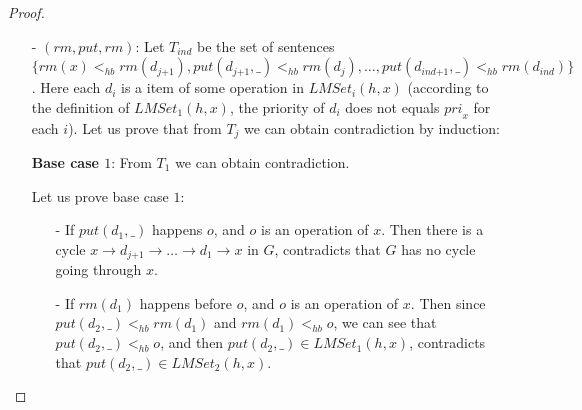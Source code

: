 \begin {proof}
\begin{itemize}
\begin{itemize}
    \item[-] If $( j = 1 ) \wedge ( \textit{put}(d_j,\_) <_{hb} o'' )$, where $o''$ is an operation of $x$: Similar to above case.

    \item[-] If $( j > 1 ) \wedge ( \textit{rm}(d_j) <_{hb} o'' )$, where $o''$ is an operation of item $d_{\textit{j-1}}$ and $\textit{put}(d_{\textit{j-1}},\_), \textit{rm}(d_{\textit{j-1}}) \in \textit{LMSet}_{\textit{j-1}}(h,x)$: Then since $( \textit{put}(d_{\textit{j+1}},\_) <_{hb} \textit{put}(d_j,\_) ) \wedge ( \textit{rm}(d_j) <_{hb} o'' )$, we can see that $( \textit{put}(d_{\textit{j+1}},\_) <_{hb} o'' ) \vee ( \textit{rm}(d_j) <_{hb} \textit{put}(d_j,\_) )$, which is impossible.

    \item[-] If $( j > 1 ) \wedge ( \textit{rm}(d_j) <_{hb} o'' )$, where $o''$ is an operation of $x$: Similar to above case.
    \end{itemize}

\item[-] $(\textit{rm},\textit{put},\textit{rm})$: Let $T_{\textit{ind}}$ be the set of sentences $\{ \textit{rm}(x) <_{hb} \textit{rm}(d_{\textit{j+1}}), \textit{put}(d_{\textit{j+1}},\_) <_{hb} \textit{rm}(d_j),\ldots, \textit{put}(d_{\textit{ind+1}},\_) <_{hb} \textit{rm}(d_{\textit{ind}}) \}$. Here each $d_i$ is a item of some operation in $\textit{LMSet}_i(h,x)$ (according to the definition of $\textit{LMSet}_1(h,x)$, the priority of $d_i$ does not equals $\textit{pri}_x$ for each $i$). Let us prove that from $T_j$ we can obtain contradiction by induction:

    {\bf Base case $1$}: From $T_1$ we can obtain contradiction.

    Let us prove base case $1$:

    \begin{itemize}
    \setlength{\itemsep}{0.5pt}
    \item[-] If $\textit{put}(d_1,\_)$ happens $o$, and $o$ is an operation of $x$. Then there is a cycle $x \rightarrow d_{\textit{j+1}} \rightarrow \ldots \rightarrow d_1 \rightarrow x$ in $G$, contradicts that $G$ has no cycle going through $x$.

    \item[-] If $\textit{rm}(d_1)$ happens before $o$, and $o$ is an operation of $x$. Then since $\textit{put}(d_2,\_) <_{hb} \textit{rm}(d_1)$ and $\textit{rm}(d_1) <_{hb} o$, we can see that $\textit{put}(d_2,\_) <_{hb} o$, and then $\textit{put}(d_2,\_) \in \textit{LMSet}_1(h,x)$, contradicts that $\textit{put}(d_2,\_) \in \textit{LMSet}_2(h,x)$.
    \end{itemize}


\end{itemize}
\end{proof}
